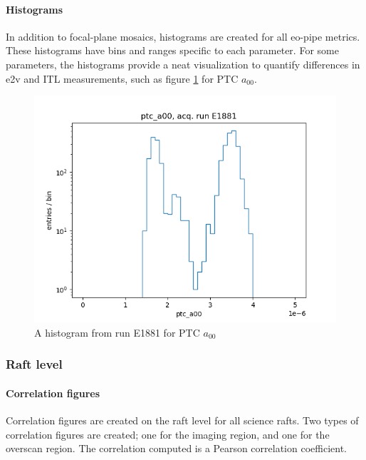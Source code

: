 \paragraph{Histograms}

In addition to focal-plane mosaics, histograms are created for all eo-pipe metrics. These histograms have bins and ranges specific to each parameter. For some parameters, the histograms provide a neat visualization to quantify differences in e2v and ITL measurements, such as figure \ref{fig:ref:histogram} for PTC $a_{00}$. 

\begin{figure}[ht]
    \centering
    \includegraphics[width=0.8\linewidth]{figures/ReferenceFigures/ptc_a00_hist_LSSTCam_u_lsstccs_eo_ptc_plots_E1881_w_2024_35_20241105T131208Z.png}
    \caption{A histogram from run E1881 for PTC $a_{00}$}
    \label{fig:ref:histogram}
\end{figure}
\clearpage
\subsubsection{Raft level}

\paragraph{Correlation figures}

Correlation figures are created on the raft level for all science rafts. Two types of correlation figures are created; one for the imaging region, and one for the overscan region. The correlation computed is a Pearson correlation coefficient.

